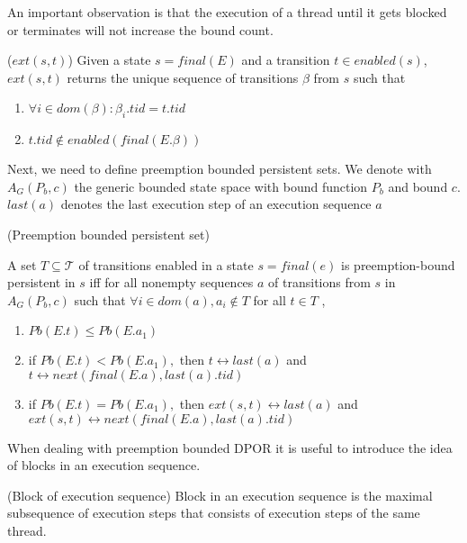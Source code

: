 An important observation is that the execution of a thread until it gets blocked or terminates will not increase
the bound count.
\begin{definition}{($ext(s,t)$)}
    Given a state $s = final(E)$ and a transition $t \in enabled(s)$,
    $ext(s,t)$ returns the unique sequence of transitions $\beta$ from $s$
    such that
    \begin{enumerate}
        \item $\forall i \in dom(\beta): \beta_i.tid = t.tid$
        \item $t.tid \notin enabled(final(E.\beta))$
    \end{enumerate}
\end{definition}

Next, we need to define preemption bounded persistent sets. We denote with $A_G(P_b,c)$ the generic 
bounded state space with bound function $P_b$ and bound $c$. $last(a)$ denotes the last execution step of
an execution sequence $a$

\begin{definition}{(Preemption bounded persistent set)}

A set $T \subseteq \mathcal{T}$ of transitions enabled in a state $s=final(e)$
is preemption-bound persistent in $s$ iff for all nonempty
sequences $a$ of transitions from $s$ in $A_G(P_b,c)$ such that
$\forall i \in dom(a), a_i \notin T$ for all $t \in T$ ,

\begin{enumerate}
\item $Pb(E.t) \leq Pb(E.a_1)$
\item if $Pb(E.t)<Pb(E.a_{1}) ,$ then $t \leftrightarrow last(a)$ and $t \leftrightarrow  next(final(E.a), last(a).tid)$
\item if $Pb(E.t)=Pb(E.a_{1}),$ then $ext(s,t) \leftrightarrow last(a)$ and $ext(s,t) \leftrightarrow next(final(E.a), last(a).tid)$
\end{enumerate}

\end{definition}

When dealing with preemption bounded DPOR it is useful to introduce the idea of blocks in an execution sequence.

\begin{definition}{(Block of execution sequence)}
    Block in an execution sequence is the maximal subsequence of execution steps that consists of execution steps of the same thread.
\end{definition}

